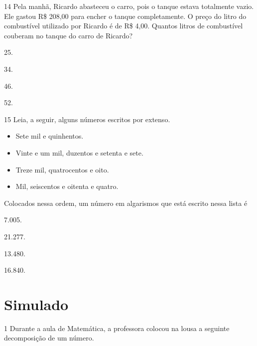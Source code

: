 \num{14} Pela manhã, Ricardo abasteceu o carro, pois o tanque estava totalmente
vazio. Ele gastou R\$ 208,00 para encher o tanque completamente.
O preço do litro do combustível utilizado por Ricardo
é de R\$ 4,00. Quantos litros de combustível couberam no tanque do carro de
Ricardo?

\begin{multicols}{2}
\begin{escolha}
\item
  25.
\item
  34.
\item
  46.
\item
  52.
\end{escolha}
\end{multicols}

\num{15} Leia, a seguir, alguns números escritos por extenso.

\begin{itemize}
\item Sete mil e quinhentos.

\item Vinte e um mil, duzentos e setenta e sete.

\item Treze mil, quatrocentos e oito.

\item Mil, seiscentos e oitenta e quatro.
\end{itemize}\enlargethispage{\baselineskip}

Colocados nessa ordem, um número em algarismos que está escrito nessa lista é

\begin{multicols}{2}
\begin{escolha}
\item 7.005.
\item 21.277.
\item 13.480.
\item 16.840.
\end{escolha}
\end{multicols}
\pagebreak

\chapter[Simulado 3]{Simulado}

\num{1} Durante a aula de Matemática, a professora colocou na lousa a seguinte
decomposição de um número.


